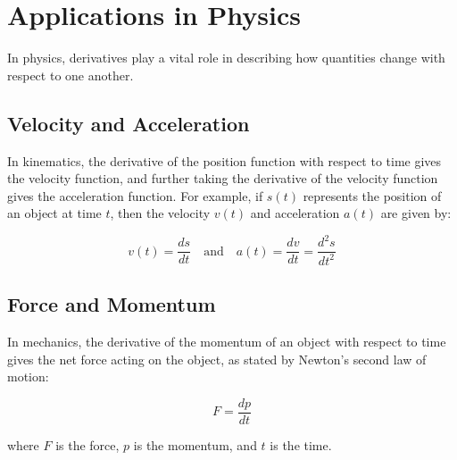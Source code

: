 \section{Applications in Physics}

In physics, derivatives play a vital role in describing how quantities
change with respect to one another.

\subsection{Velocity and Acceleration}

In kinematics, the derivative of the position function with respect to
time gives the velocity function, and further taking the derivative of
the velocity function gives the acceleration function. For example, if
$s(t)$ represents the position of an object at time $t$, then the
velocity $v(t)$ and acceleration $a(t)$ are given by:

\begin{equation}
v(t) = \frac{ds}{dt} \quad \text{and} \quad a(t) = \frac{dv}{dt} = \frac{d^2s}{dt^2}
\end{equation}

\subsection{Force and Momentum}

In mechanics, the derivative of the momentum of an object with respect
to time gives the net force acting on the object, as stated by
Newton's second law of motion:

\begin{equation}
F = \frac{dp}{dt}
\end{equation}

where $F$ is the force, $p$ is the momentum, and $t$ is the time.


